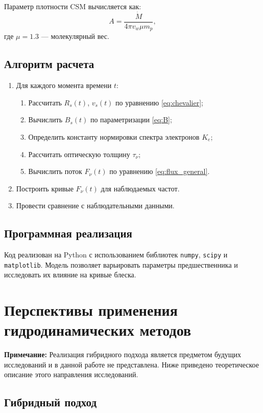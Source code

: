 \documentclass[a4paper,12pt]{extarticle}
\newcommand{\rs}{R_s}
\newcommand{\vs}{v_s}
\begin{document}
Параметр плотности CSM вычисляется как:
\begin{equation}
    A = \frac{\dot{M}}{4\pi v_w \mu m_p},
\end{equation}
где $\mu = 1.3$ — молекулярный вес.

\subsection{Алгоритм расчета}

\begin{enumerate}
    \item Для каждого момента времени $t$:
    \begin{enumerate}
        \item Рассчитать $\rs(t)$, $\vs(t)$ по уравнению \eqref{eq:chevalier};
        \item Вычислить $B_s(t)$ по параметризации \eqref{eq:B};
        \item Определить константу нормировки спектра электронов $K_e$;
        \item Рассчитать оптическую толщину $\tau_\nu$;
        \item Вычислить поток $F_\nu(t)$ по уравнению \eqref{eq:flux_general}.
    \end{enumerate}
    \item Построить кривые $F_\nu(t)$ для наблюдаемых частот.
    \item Провести сравнение с наблюдательными данными.
\end{enumerate}

\subsection{Программная реализация}

Код реализован на Python с использованием библиотек \texttt{numpy}, \texttt{scipy} и \texttt{matplotlib}. Модель позволяет варьировать параметры предшественника и исследовать их влияние на кривые блеска.

\section{Перспективы применения гидродинамических методов}

\textbf{Примечание:} Реализация гибридного подхода является предметом будущих исследований и в данной работе не представлена. Ниже приведено теоретическое описание этого направления исследований.

\subsection{Гибридный подход}
\end{document}
